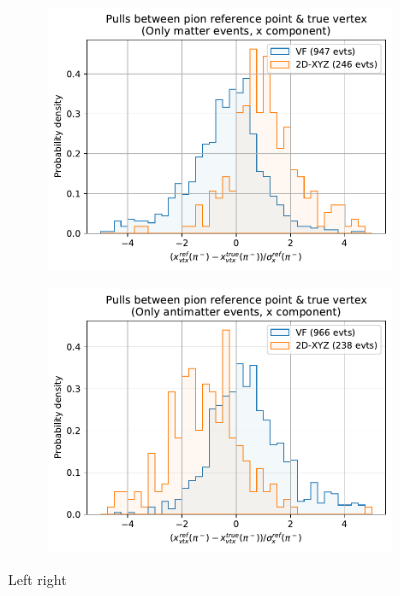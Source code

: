 \begin{figure}[t]
	\centering
	\begin{subfigure}{.45\textwidth}
		\includegraphics[width=\textwidth]{graphics/03-vertex_reconstruction/pim_refpoint_residual_2Dv3D_x_rel_matter.pdf}
		\caption{}
		\label{fig:pim_refpoint_residual_2Dv3D_x_rel_matter}
	\end{subfigure}
	\begin{subfigure}{.45\textwidth}
		\includegraphics[width=\textwidth]{graphics/03-vertex_reconstruction/pim_refpoint_residual_2Dv3D_x_rel_antimatter.pdf}
		\caption{}
		\label{fig:pim_refpoint_residual_2Dv3D_x_rel_antimatter}
	\end{subfigure}
	\caption[A and b.]{Left right}
	\label{fig:pim_refpoint_residual_2Dv3D_x_rel}
\end{figure}

